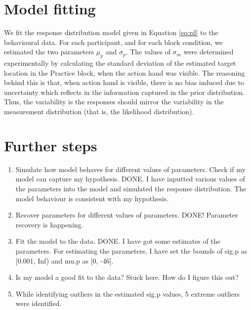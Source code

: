 \section{Model fitting}

We fit the response distribution model given in Equation \ref{eq:rd} to the behavioural data. For each participant, and for each block condition, we estimated the two parameters $\mu_p$ and $\sigma_p$. The values of $\sigma_m$ were determined experimentally by calculating the standard deviation of the estimated target location in the Practice block, when the action hand was visible. The reasoning behind this is that, when action hand is visible, there is no bias induced due to uncertainty which reflects in the information captured in the prior distribution. Thus, the variability is the responses should mirror the variability in the measurement distribution (that is, the likelihood distribution).

\section{Further steps}

\begin{enumerate}
    \item Simulate how model behaves for different values of parameters. Check if my model can capture my hypothesis. DONE. I have inputted various values of the parameters into the model and simulated the response distribution. The model behaviour is consistent with my hypothesis.
    
    \item Recover parameters for different values of parameters. DONE! Parameter recovery is happening. 
    
    \item Fit the model to the data. DONE. I have got some estimates of the parameters. For estimating the parameters, I have set the bounds of sig.p as [0.001, Inf) and mu.p as [0, -46]. 
    
    \item Is my model a good fit to the data? Stuck here. How do I figure this out?
    
    \item While identifying outliers in the estimated sig.p values, 5 extreme outliers were identified.
    
    
\end{enumerate}
